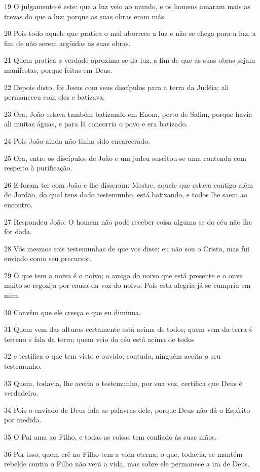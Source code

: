 \par 19 O julgamento é este: que a luz veio ao mundo, e os homens amaram mais as trevas do que a luz; porque as suas obras eram más.
\par 20 Pois todo aquele que pratica o mal aborrece a luz e não se chega para a luz, a fim de não serem argüidas as suas obras.
\par 21 Quem pratica a verdade aproxima-se da luz, a fim de que as suas obras sejam manifestas, porque feitas em Deus.
\par 22 Depois disto, foi Jesus com seus discípulos para a terra da Judéia; ali permaneceu com eles e batizava.
\par 23 Ora, João estava também batizando em Enom, perto de Salim, porque havia ali muitas águas, e para lá concorria o povo e era batizado.
\par 24 Pois João ainda não tinha sido encarcerado.
\par 25 Ora, entre os discípulos de João e um judeu suscitou-se uma contenda com respeito à purificação.
\par 26 E foram ter com João e lhe disseram: Mestre, aquele que estava contigo além do Jordão, do qual tens dado testemunho, está batizando, e todos lhe saem ao encontro.
\par 27 Respondeu João: O homem não pode receber coisa alguma se do céu não lhe for dada.
\par 28 Vós mesmos sois testemunhas de que vos disse: eu não sou o Cristo, mas fui enviado como seu precursor.
\par 29 O que tem a noiva é o noivo; o amigo do noivo que está presente e o ouve muito se regozija por causa da voz do noivo. Pois esta alegria já se cumpriu em mim.
\par 30 Convém que ele cresça e que eu diminua.
\par 31 Quem vem das alturas certamente está acima de todos; quem vem da terra é terreno e fala da terra; quem veio do céu está acima de todos
\par 32 e testifica o que tem visto e ouvido; contudo, ninguém aceita o seu testemunho.
\par 33 Quem, todavia, lhe aceita o testemunho, por sua vez, certifica que Deus é verdadeiro.
\par 34 Pois o enviado de Deus fala as palavras dele, porque Deus não dá o Espírito por medida.
\par 35 O Pai ama ao Filho, e todas as coisas tem confiado às suas mãos.
\par 36 Por isso, quem crê no Filho tem a vida eterna; o que, todavia, se mantém rebelde contra o Filho não verá a vida, mas sobre ele permanece a ira de Deus.

